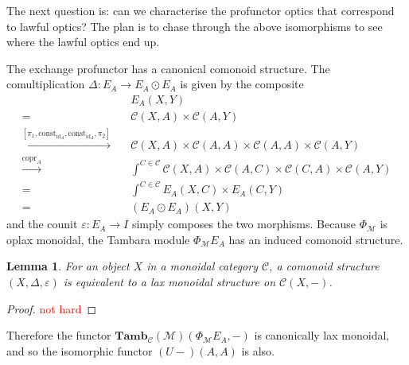 \documentclass[11pt,a4paper]{article}
\theoremstyle{plain}
\newtheorem{lemma}[theorem]{Lemma}
\theoremstyle{definition}
\newcommand{\C}{\mathscr{C}}
\newcommand{\M}{\mathscr{M}}
\newcommand{\Pastro}{\Phi}
\newcommand{\Tamb}{\mathbf{Tamb}}
\newcommand{\id}{\mathrm{id}}
\newcommand{\const}{\mathrm{const}}
\DeclareMathOperator{\copr}{copr}
\newcommand{\todo}[1]{\textcolor{red}{\small #1}}
\begin{document}
The next question is: can we characterise the profunctor optics that correspond to lawful optics? The plan is to chase through the above isomorphisms to see where the lawful optics end up.

The exchange profunctor has a canonical comonoid structure. The comultiplication $\Delta : E_A \to E_A \odot E_A$ is given by the composite
\begin{align*}
&E_A(X,Y) \\
= \quad& \C(X, A) \times \C(A, Y) \\
\xrightarrow{[\pi_1, \const_{\id_A}, \const_{\id_A}, \pi_2]} \quad& \C(X, A) \times \C(A, A) \times \C(A, A) \times \C(A, Y) \\
\xrightarrow{\copr_A} \quad& \int^{C \in \C} \C(X, A) \times \C(A, C) \times \C(C, A) \times \C(A, Y) \\
= \quad& \int^{C \in \C} E_A(X,C) \times E_A(C,Y) \\
= \quad&  (E_A \odot E_A)(X,Y)
\end{align*}
and the counit $\varepsilon : E_A \to I$ simply composes the two morphisms. Because $\Pastro_\M$ is oplax monoidal, the Tambara module $\Pastro_\M E_A$ has an induced comonoid structure.

\begin{lemma}
For an object $X$ in a monoidal category $\C$, a comonoid structure $(X,\Delta,\varepsilon)$ is equivalent to a lax monoidal structure on $\C(X, -)$.
\end{lemma}
\begin{proof}
\todo{not hard}
\end{proof}

Therefore the functor $\Tamb_\C(\M)(\Pastro_\M E_A, -)$ is canonically lax monoidal, and so the isomorphic functor $(U-)(A,A)$ is also.
\end{document}
